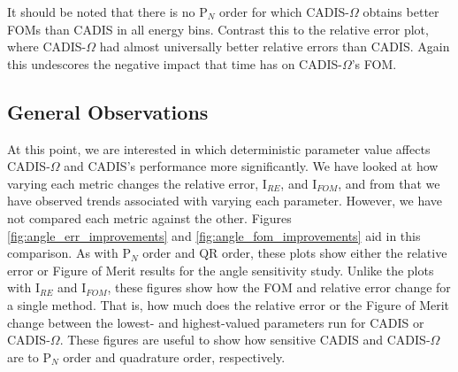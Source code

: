 It should be
noted that there is no P$_N$ order for which CADIS-$\Omega$ obtains better FOMs
than CADIS in all energy bins. Contrast this to the relative error plot, where
CADIS-$\Omega$ had almost universally better relative errors than CADIS. Again
this undescores the negative impact that time has on CADIS-$\Omega$'s FOM.

%
%
%
%
%
%
%


\subsection{General Observations}
\label{subsec:observations}

At this point, we are interested in which deterministic parameter value affects
CADIS-$\Omega$ and CADIS's performance more significantly. We
have looked at how varying each metric changes the relative error, I$_{RE}$, and
I$_{FOM}$, and from that we have observed trends associated with varying each
parameter. However, we have not compared each metric against the other.
Figures \ref{fig:angle_err_improvements} and \ref{fig:angle_fom_improvements}
aid in this comparison. As with P$_N$ order and QR
order, these plots show either the relative error or Figure of Merit results for
the angle sensitivity study. Unlike the plots with I$_{RE}$ and I$_{FOM}$, these
figures show how the FOM and relative error change for a single method. That is,
how much does the relative error or the Figure of Merit change between the lowest-
and highest-valued parameters run for CADIS or CADIS-$\Omega$.
These figures are useful to show how
sensitive CADIS and CADIS-$\Omega$ are to P$_N$ order and quadrature order,
respectively.


